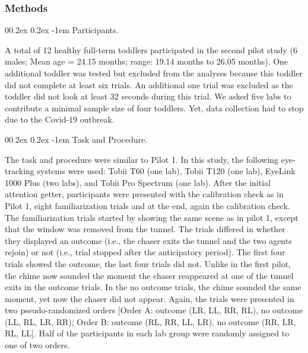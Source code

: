 \documentclass[
  english,
  man, donotrepeattitle,floatsintext]{apa6}
\makeatletter
\let\oldparagraph\paragraph
\renewcommand{\paragraph}[1]{\oldparagraph{#1}\mbox{}}
\renewcommand{\paragraph}{\@startsection{paragraph}{4}{\parindent}%
  {0\baselineskip \@plus 0.2ex \@minus 0.2ex}%
  {-1em}%
  {\normalfont\normalsize\bfseries\itshape\typesectitle}}
\makeatother
\begin{document}
\hypertarget{methods-1}{%
\subsubsection{Methods}\label{methods-1}}

\hypertarget{participants.-1}{%
\paragraph{Participants.}\label{participants.-1}}

A total of 12 healthy full-term toddlers participated in the second pilot study (6 males; Mean age = 24.15 months; range: 19.14 months to 26.05 months). One additional toddler was tested but excluded from the analyses because this toddler did not complete at least six trials. An additional one trial was excluded as the toddler did not look at least 32 seconds during this trial. We asked five labs to contribute a minimal sample size of four toddlers. Yet, data collection had to stop due to the Covid-19 outbreak.

\hypertarget{task-and-procedure.-1}{%
\paragraph{Task and Procedure.}\label{task-and-procedure.-1}}

The task and procedure were similar to Pilot 1. In this study, the following eye-tracking systems were used: Tobii T60 (one lab), Tobii T120 (one lab), EyeLink 1000 Plus (two labs), and Tobii Pro Spectrum (one lab). After the initial attention getter, participants were presented with the calibration check as in Pilot 1, eight familiarization trials and at the end, again the calibration check. The familiarization trials started by showing the same scene as in pilot 1, except that the window was removed from the tunnel. The trials differed in whether they displayed an outcome (i.e., the chaser exits the tunnel and the two agents rejoin) or not (i.e., trial stopped after the anticipatory period). The first four trials showed the outcome, the last four trials did not. Unlike in the first pilot, the chime now sounded the moment the chaser reappeared at one of the tunnel exits in the outcome trials. In the no outcome trials, the chime sounded the same moment, yet now the chaser did not appear. Again, the trials were presented in two pseudo-randomized orders {[}Order A: outcome (LR, LL, RR, RL), no outcome (LL, RL, LR, RR); Order B: outcome (RL, RR, LL, LR), no outcome (RR, LR, RL, LL{]}. Half of the participants in each lab group were randomly assigned to one of two orders.
\end{document}
